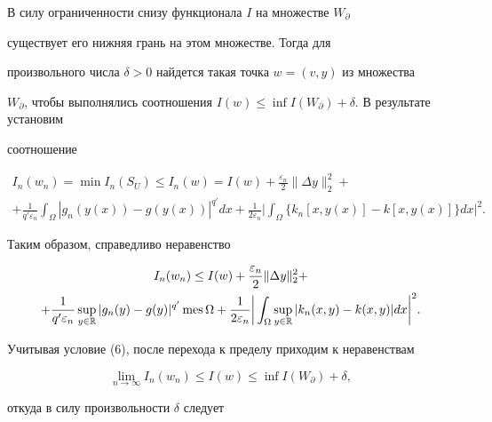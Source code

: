 \begin{pf} 


В силу ограниченности снизу функционала $I$ на множестве $W_\partial$ 


существует его нижняя грань на этом множестве. Тогда для 


произвольного числа $\delta>0$ найдется такая точка $w=(v,y)$ из множества 


$W_\partial$, чтобы выполнялись соотношения $I(w)\le\inf 


I(W_\partial)+\delta$. В результате установим 


соотношение 


\begin{gather*} 


I_n(w_n)=\min I_n(S_U)\le I_n(w)=I(w)+\frac{\varepsilon_n}{2} 


\|\Delta y\|^2_2+ \\ 


% 


+\frac{1}{q'\varepsilon_n}\int_\Omega|g_n(y(x))-g(y(x))|^{q'} 


dx+\frac{1}{2\varepsilon_n}\bigg|\int_\Omega 


\{k_n[x,y(x)]-k[x,y(x)]\}dx\bigg|^2. 


\end{gather*} 


Таким образом, справедливо неравенство 


\begin{gather*} 


I_n(w_n)\le I(w)+\frac{\varepsilon_n}{2}\|\Delta y\|^2_2+\\ 


% 


+\frac{1}{q'\varepsilon_n}\sup_{y\in\Bbb R} 


|g_n(y)-g(y)|^{q'}\mes\Omega+\frac{1}{2\varepsilon_n}\bigg| 


\int_\Omega\sup_{y\in\Bbb R}|k_n(x,y)-k(x,y)|dx\bigg|^2. 


\end{gather*} 


Учитывая условие (6), после перехода к пределу приходим к неравенствам 


$$ 


\lim_{n\to\infty}I_n(w_n)\le I(w)\le\inf I(W_\partial)+\delta, 


$$ 


откуда в силу произвольности $\delta$ следует 


\begin{equation} 



\end{equation}
\end{pf}
